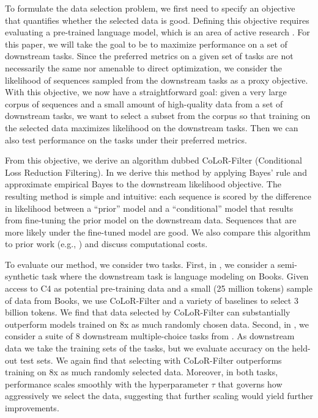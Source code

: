 \documentclass{article}
\begin{document}
To formulate the data selection problem, we first need to specify an objective that quantifies whether the selected data is good. 
Defining this objective requires evaluating a pre-trained language model, which is an area of active research \citep{eval-harness, magnusson2023paloma, engstrom2024dsdm, chang2024survey}. 
For this paper, we will take the goal to be to maximize performance on a set of downstream tasks.
Since the preferred metrics on a given set of tasks are not necessarily the same nor amenable to direct optimization, we consider the likelihood of sequences sampled from the downstream tasks as a proxy objective.  
With this objective, we now have a straightforward goal: 
given a very large corpus of sequences and a small amount of high-quality data from a set of downstream tasks, we want to select a subset from the corpus so that training on the selected data maximizes likelihood on the downstream tasks. 
Then we can also test performance on the tasks under their preferred metrics.

From this objective, we derive an algorithm dubbed CoLoR-Filter (Conditional Loss Reduction Filtering). In  we derive this method by applying Bayes' rule and approximate empirical Bayes to the downstream likelihood objective. The resulting method is simple and intuitive: each sequence is scored by the difference in likelihood between a ``prior'' model and a ``conditional'' model that results from fine-tuning the prior model on the downstream data. Sequences that are more likely under the fine-tuned model are good. We also compare this algorithm to prior work (e.g., \citep{mindermann2022prioritized}) and discuss computational costs.





To evaluate our method, we consider two tasks. First, in , we consider a semi-synthetic task where the downstream task is language modeling on Books. Given access to C4 \citep{raffel2020exploring} as potential pre-training data and a small (25 million tokens) sample of data from Books, we use CoLoR-Filter and a variety of baselines to select 3 billion tokens. We find that data selected by CoLoR-Filter can substantially outperform models trained on 8x as much randomly chosen data.
Second, in , we consider a suite of 8 downstream multiple-choice tasks from \citet{groeneveld2024olmo}. As downstream data we take the training sets of the tasks, but we evaluate accuracy on the held-out test sets. We again find that selecting with CoLoR-Filter outperforms training on 8x as much randomly selected data. Moreover, in both tasks, performance scales smoothly with the hyperparameter $ \tau $ that governs how aggressively we select the data, suggesting that further scaling would yield further improvements.
\end{document}
